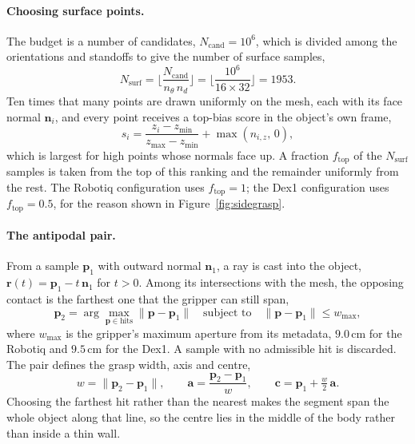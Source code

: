 \documentclass{article}
\begin{document}
\paragraph{Choosing surface points.}
The budget is a number of candidates, $N_{\mathrm{cand}}=10^6$, which is divided among the orientations and standoffs to give the number of surface samples,
\begin{equation}
  N_{\mathrm{surf}} = \Big\lfloor \frac{N_{\mathrm{cand}}}{n_\theta\, n_d} \Big\rfloor = \Big\lfloor \frac{10^6}{16\times 32} \Big\rfloor = 1953 .
\end{equation}
Ten times that many points are drawn uniformly on the mesh, each with its face normal $\bm n_i$, and every point receives a top-bias score in the object's own frame,
\begin{equation}
  s_i = \frac{z_i - z_{\min}}{z_{\max}-z_{\min}} + \max(n_{i,z},\,0),
  \label{eq:topbias}
\end{equation}
which is largest for high points whose normals face up. A fraction $f_{\mathrm{top}}$ of the $N_{\mathrm{surf}}$ samples is taken from the top of this ranking and the remainder uniformly from the rest. The Robotiq configuration uses $f_{\mathrm{top}}=1$; the Dex1 configuration uses $f_{\mathrm{top}}=0.5$, for the reason shown in Figure~\ref{fig:sidegrasp}.

\paragraph{The antipodal pair.}
From a sample $\bm p_1$ with outward normal $\bm n_1$, a ray is cast into the object, $\bm r(t)=\bm p_1 - t\,\bm n_1$ for $t>0$. Among its intersections with the mesh, the opposing contact is the farthest one that the gripper can still span,
\begin{equation}
  \bm p_2 = \arg\max_{\bm p\in\text{hits}} \lVert \bm p-\bm p_1\rVert
  \quad\text{subject to}\quad \lVert \bm p-\bm p_1\rVert \le w_{\max},
\end{equation}
where $w_{\max}$ is the gripper's maximum aperture from its metadata, $9.0$\,cm for the Robotiq and $9.5$\,cm for the Dex1. A sample with no admissible hit is discarded. The pair defines the grasp width, axis and centre,
\begin{equation}
  w = \lVert \bm p_2-\bm p_1\rVert, \qquad \bm a = \frac{\bm p_2-\bm p_1}{w}, \qquad \bm c = \bm p_1 + \tfrac{w}{2}\,\bm a .
  \label{eq:pair}
\end{equation}
Choosing the farthest hit rather than the nearest makes the segment span the whole object along that line, so the centre lies in the middle of the body rather than inside a thin wall.
\end{document}
